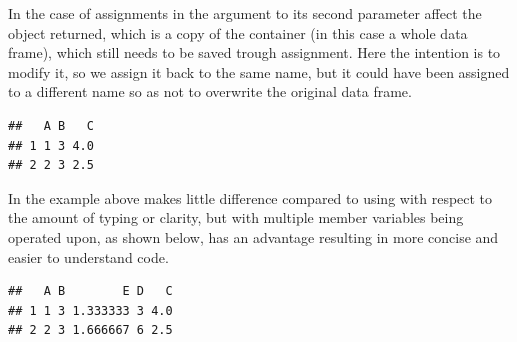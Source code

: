 \documentclass[krantz2]{krantz}\usepackage{knitr}%
\begin{document}
\begin{explainbox}
In the case of  assignments in the argument to its second parameter affect the object returned, which is a copy of the container (in this case a whole data frame), which still needs to be saved trough assignment. Here the intention is to modify it, so we assign it back to the same name, but it could have been assigned to a different name so as not to overwrite the original data frame.

\begin{knitrout}\footnotesize
{}\color{fgcolor}\begin{kframe}
\begin{alltt}
\hlopt{$} \hlkwb{<-} 
 \hlkwb{<-}  \hlkwb{<-}  \hlopt{+}  \hlopt{/} 
 \hlstd{)}
\end{alltt}
\begin{verbatim}
##   A B   C
## 1 1 3 4.0
## 2 2 3 2.5
\end{verbatim}
\end{kframe}
\end{knitrout}
In the example above  makes little difference compared to using  with respect to the amount of typing or clarity, but with multiple member variables being operated upon, as shown below,  has an advantage resulting in more concise and easier to understand code.

\begin{knitrout}\footnotesize
{}\color{fgcolor}\begin{kframe}
\begin{alltt}
\hlopt{$} \hlkwb{<-} 
 \hlkwb{<-} 
                            \hlkwb{<-}  \hlopt{+}  \hlopt{/} 
                             \hlkwb{<-}  \hlopt{*} 
                             \hlkwb{<-}  \hlopt{/}  \hlopt{+} \hlstd{\}}
                           \hlstd{)}
 \hlstd{)}
\end{alltt}
\begin{verbatim}
##   A B        E D   C
## 1 1 3 1.333333 3 4.0
## 2 2 3 1.666667 6 2.5
\end{verbatim}
\end{kframe}
\end{knitrout}


\end{explainbox}
\end{document}
